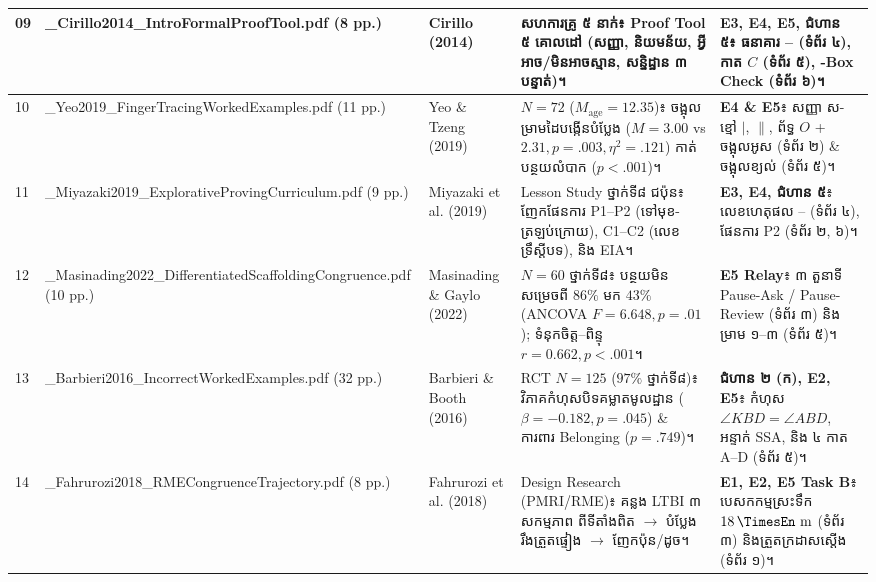 \documentclass[a4paper,12pt]{article}
\newcommand{\en}[1]{{\TimesEn #1}}
\newcommand{\unit}[1]{\,\text{\en{#1}}}
\newcommand{\cnum}[1]{{\fontsize{10.5pt}{12pt}\selectfont\ding{\numexpr181+#1\relax}}}
\newcommand{\ang}[1]{\ensuremath{\angle #1}}
\begin{document}
\begin{longtable}{|C{0.70cm}|L{3.60cm}|L{2.55cm}|L{5.75cm}|L{4.00cm}|}
09 & \en{09\_\allowbreak Cirillo2014\_\allowbreak IntroFormal\allowbreak ProofTool.pdf} \en{(8 pp.)} & \en{Cirillo (2014)} &
សហការគ្រូ ៥ នាក់៖ \en{Proof Tool} ៥ គោលដៅ (សញ្ញា, និយមន័យ, អ្វីអាច/មិនអាចស្មាន, សន្និដ្ឋាន ៣ បន្ទាត់)។ &
\textbf{E3, E4, E5, ជំហាន ៥}៖ ធនាគារ \cnum{1}--\cnum{5} (ទំព័រ ៤), កាត $C$ (ទំព័រ ៥), \en{3-Box Check} (ទំព័រ ៦)។ \\ \hline

10 & \en{10\_\allowbreak Yeo2019\_\allowbreak Finger\allowbreak Tracing\allowbreak Worked\allowbreak Examples.pdf} \en{(11 pp.)} & \en{Yeo \& Tzeng (2019)} &
$N=72$ ($M_{\text{age}}=12.35$)៖ ចង្អុលម្រាមដៃបង្កើនបំប្លែង ($M=3.00$ \en{vs} $2.31, p=.003, \eta^2=.121$) កាត់បន្ថយលំបាក ($p<.001$)។ &
\textbf{E4 \& E5}៖ សញ្ញា ស-ខ្មៅ $|$, $\parallel$, ព័ទ្ធ $O$ + ចង្អុលអូស (ទំព័រ ២) \& ចង្អុលខ្យល់ (ទំព័រ ៥)។ \\ \hline

11 & \en{11\_\allowbreak Miyazaki2019\_\allowbreak Explorative\allowbreak Proving\allowbreak Curriculum.pdf} \en{(9 pp.)} & \en{Miyazaki et al. (2019)} &
\en{Lesson Study} ថ្នាក់ទី៨ ជប៉ុន៖ ញែកផែនការ \en{P1--P2} (ទៅមុខ-ត្រឡប់ក្រោយ), \en{C1--C2} (លេខទ្រឹស្ដីបទ), និង \en{EIA}។ &
\textbf{E3, E4, ជំហាន ៥}៖ លេខហេតុផល \cnum{1}--\cnum{5} (ទំព័រ ៤), ផែនការ \en{P2} (ទំព័រ ២, ៦)។ \\ \hline

12 & \en{12\_\allowbreak Masinading2022\_\allowbreak Differentiated\allowbreak Scaffolding\allowbreak Congruence.pdf} \en{(10 pp.)} & \en{Masinading \& Gaylo (2022)} &
$N=60$ ថ្នាក់ទី៨៖ បន្ថយមិនសម្រេចពី $86\%$ មក $43\%$ (\en{ANCOVA} $F=6.648, p=.01$); ទំនុកចិត្ត--ពិន្ទុ $r=0.662, p<.001$។ &
\textbf{E5 Relay}៖ ៣ តួនាទី \en{Pause-Ask / Pause-Review} (ទំព័រ ៣) និងម្រាម ១--៣ (ទំព័រ ៥)។ \\ \hline

13 & \en{13\_\allowbreak Barbieri2016\_\allowbreak Incorrect\allowbreak Worked\allowbreak Examples.pdf} \en{(32 pp.)} & \en{Barbieri \& Booth (2016)} &
\en{RCT} $N=125$ ($97\%$ ថ្នាក់ទី៨)៖ វិភាគកំហុសបិទគម្លាតមូលដ្ឋាន ($\beta=-0.182, p=.045$) \& ការពារ \en{Belonging} ($p=.749$)។ &
\textbf{ជំហាន ២ (ក), E2, E5}៖ កំហុស $\ang{KBD}=\ang{ABD}$, អន្ទាក់ \en{SSA}, និង ៤ កាត \en{A--D} (ទំព័រ ៥)។ \\ \hline

14 & \en{14\_\allowbreak Fahrurozi2018\_\allowbreak RME\allowbreak Congruence\allowbreak Trajectory.pdf} \en{(8 pp.)} & \en{Fahrurozi et al. (2018)} &
\en{Design Research (PMRI/RME)}៖ គន្លង \en{LTBI} ៣ សកម្មភាព ពីទីតាំងពិត $\to$ បំប្លែងរឹងត្រួតផ្ទៀង $\to$ ញែកប៉ុន/ដូច។ &
\textbf{E1, E2, E5 Task B}៖ បេសកកម្មស្រះទឹក $18\unit{m}$ (ទំព័រ ៣) និងត្រួតក្រដាសស្តើង (ទំព័រ ១)។ \\

\end{longtable}
\endgroup
\end{document}
